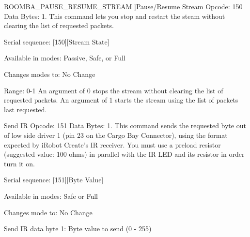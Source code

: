 \begin{Desc}
\begin{description}
{\hypertarget{group__roomba-lib_gga305e17dfb7050ad83ea49ded2e6a2e24ab58d7a4edc71f5877180d177bc7f83d0}{}R\+O\+O\+M\+B\+A\+\_\+\+P\+A\+U\+S\+E\+\_\+\+R\+E\+S\+U\+M\+E\+\_\+\+S\+T\+R\+E\+A\+M\label{group__roomba-lib_gga305e17dfb7050ad83ea49ded2e6a2e24ab58d7a4edc71f5877180d177bc7f83d0}
}]Pause/\+Resume Stream Opcode\+: 150 Data Bytes\+: 1. This command lets you stop and restart the steam without clearing the list of requested packets.
\begin{DoxyItemize}
\item Serial sequence\+: \mbox{[}150\mbox{]}\mbox{[}Stream State\mbox{]}
\item Available in modes\+: Passive, Safe, or Full
\item Changes modes to\+: No Change
\item Range\+: 0-\/1 An argument of 0 stops the stream without clearing the list of requested packets. An argument of 1 starts the stream using the list of packets last requested. 
\end{DoxyItemize}\item[{\em 
\hypertarget{group__roomba-lib_gga305e17dfb7050ad83ea49ded2e6a2e24a9de59aa841a98e5e44796ea3cca14c79}{}S\+E\+N\+D\+\_\+\+I\+R\label{group__roomba-lib_gga305e17dfb7050ad83ea49ded2e6a2e24a9de59aa841a98e5e44796ea3cca14c79}
}]Send I\+R Opcode\+: 151 Data Bytes\+: 1. This command sends the requested byte out of low side driver 1 (pin 23 on the Cargo Bay Connector), using the format expected by i\+Robot Create’s I\+R receiver. You must use a preload resistor (suggested value\+: 100 ohms) in parallel with the I\+R L\+E\+D and its resistor in order turn it on.
\begin{DoxyItemize}
\item Serial sequence\+: \mbox{[}151\mbox{]}\mbox{[}Byte Value\mbox{]}
\item Available in modes\+: Safe or Full
\item Changes mode to\+: No Change
\item Send I\+R data byte 1\+: Byte value to send (0 -\/ 255)
\end{DoxyItemize}


\end{description}
\end{Desc}
